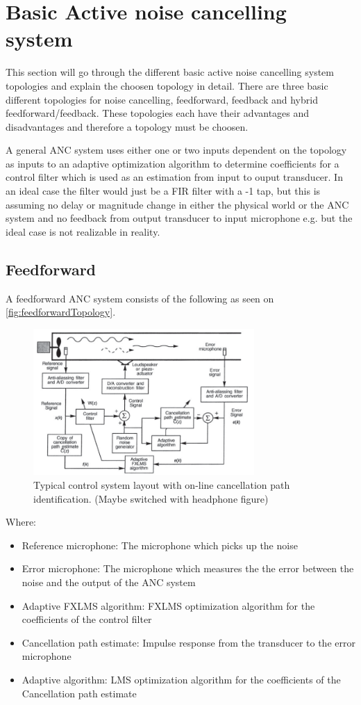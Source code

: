\section{Basic Active noise cancelling system} \label{sec:BasicSystem}
This section will go through the different basic active noise cancelling system topologies and explain the choosen topology in detail. There are three basic different topologies for noise cancelling, feedforward, feedback and hybrid feedforward/feedback. These topologies each have their advantages and disadvantages and therefore a topology must be choosen.

A general ANC system uses either one or two inputs dependent on the topology as inputs to an adaptive optimization algorithm to determine coefficients for a control filter which is used as an estimation from input to ouput transducer. In an ideal case the filter would just be a FIR filter with a -1 tap, but this is assuming no delay or magnitude change in either the physical world or the ANC system and no feedback from output transducer to input microphone e.g. but the ideal case is not realizable in reality. 




\subsection*{Feedforward}
A feedforward ANC system consists of the following as seen on \autoref{fig:feedforwardTopology}.
\begin{figure}[H]
	\centering
	\includegraphics[width=0.75\textwidth]{figures/BasicSystem/feedforward}
	\caption{Typical control system layout with on-line cancellation path identification. (Maybe switched with headphone figure)}
	\label{fig:feedforwardTopology}
\end{figure}
Where:
\begin{itemize}
\item Reference microphone: The microphone which picks up the noise 
\item Error microphone: The microphone which measures the the error between the noise and the output of the ANC system
\item Adaptive FXLMS algorithm: FXLMS optimization algorithm for the coefficients of the control filter
\item Cancellation path estimate: Impulse response from the transducer to the error microphone
\item Adaptive algorithm: LMS optimization algorithm for the coefficients of the Cancellation path estimate 
\end{itemize}

